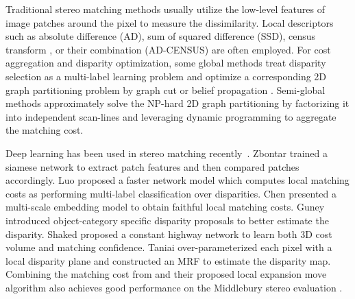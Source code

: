 \documentclass[10pt,twocolumn,letterpaper]{article}
\begin{document}
Traditional stereo matching methods usually utilize the low-level features of image patches around the pixel to measure the dissimilarity. Local descriptors such as absolute difference (AD), sum of squared difference (SSD), census transform \cite{humenberger2010census}, or their combination (AD-CENSUS) \cite{mei2011building} are often employed. For cost aggregation and disparity optimization, some   global methods   treat disparity selection as a multi-label learning problem and optimize a  corresponding 2D graph partitioning problem  by  graph cut \cite{bleyer2007graph} or belief propagation \cite{felzenszwalb2006efficient, sun2003stereo, yang2010constant}. Semi-global methods \cite{hirschmuller2008stereo}  approximately solve  the NP-hard 2D graph partitioning by factorizing it into independent scan-lines and leveraging dynamic programming to aggregate the matching cost.

Deep learning  has  been used in stereo matching recently~\cite{zagoruyko2015learning,zbontar2015computing,luo2016efficient,chen2015deep,shaked2016improved,taniai2016continuous}. Zbontar \etal \cite{zbontar2015computing} trained a siamese network to extract patch features   and then compared  patches accordingly. Luo \etal \cite{luo2016efficient} proposed a faster network model which  computes local matching costs as performing  multi-label classification over disparities.  Chen \etal
\cite{chen2015deep} presented a multi-scale embedding model to obtain faithful local matching costs. Guney \etal \cite{Guney2015CVPR}  introduced object-category specific disparity proposals to better estimate the disparity.  Shaked \etal \cite{shaked2016improved} proposed a constant highway network to learn both 3D cost volume and  matching confidence. Taniai \etal \cite{taniai2016continuous} over-parameterized each pixel with a local disparity plane and constructed an MRF to estimate the disparity map. Combining the matching cost from \cite{zbontar2015computing} and their proposed local expansion move algorithm also achieves  good performance on the Middlebury stereo evaluation \cite{scharstein2002middlebury}.
\end{document}
